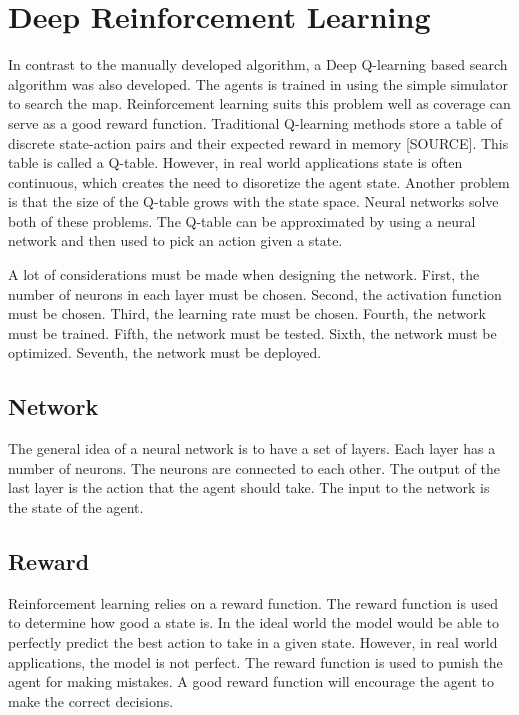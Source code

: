 \section{Deep Reinforcement Learning}
In contrast to the manually developed algorithm, a Deep Q-learning based search algorithm was also developed. The agents is trained in using the simple simulator to search the map. Reinforcement learning suits this problem well as coverage can serve as a {\color{red} good} reward function. Traditional Q-learning methods store a table of discrete state-action pairs and their expected reward in memory {\color{red}[SOURCE]}. This table is called a Q-table. However, in real world applications state is often continuous, which creates the need to {\color{red} disoretize} the agent state. Another problem is that the size of the Q-table grows with the state space. Neural networks solve both of these problems. The Q-table can be approximated by using a neural network and then used to pick an action given a state.

A lot of considerations must be made when designing the network. First, the number of neurons in each layer must be chosen. Second, the activation function must be chosen. Third, the learning rate must be chosen. Fourth, the network must be trained. Fifth, the network must be tested. Sixth, the network must be optimized. Seventh, the network must be deployed.

\subsection{Network}
The general idea of a neural network is to have a set of layers. Each layer has a number of neurons. The neurons are connected to each other. The output of the last layer is the action that the agent should take. The input to the network is the state of the agent.


\subsection{Reward}
Reinforcement learning relies on a reward function. The reward function is used to determine how good a state is. In the ideal world the model would be able to perfectly predict the best action to take in a given state. However, in real world applications, the model is not perfect. The reward function is used to punish the agent for making mistakes. A good reward function will encourage the agent to make the correct decisions.

